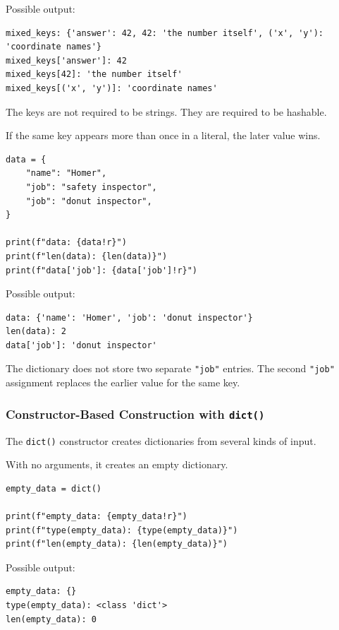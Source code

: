 Possible output:

\begin{verbatim}
mixed_keys: {'answer': 42, 42: 'the number itself', ('x', 'y'): 'coordinate names'}
mixed_keys['answer']: 42
mixed_keys[42]: 'the number itself'
mixed_keys[('x', 'y')]: 'coordinate names'
\end{verbatim}

The keys are not required to be strings. They are required to be hashable.

If the same key appears more than once in a literal, the later value wins.

\begin{verbatim}
data = {
    "name": "Homer",
    "job": "safety inspector",
    "job": "donut inspector",
}

print(f"data: {data!r}")
print(f"len(data): {len(data)}")
print(f"data['job']: {data['job']!r}")
\end{verbatim}

Possible output:

\begin{verbatim}
data: {'name': 'Homer', 'job': 'donut inspector'}
len(data): 2
data['job']: 'donut inspector'
\end{verbatim}

The dictionary does not store two separate \texttt{"job"} entries. The second \texttt{"job"} assignment replaces the earlier value for the same key.

\subsubsection{Constructor-Based Construction with \texttt{dict()}}

The \texttt{dict()} constructor creates dictionaries from several kinds of input.

With no arguments, it creates an empty dictionary.

\begin{verbatim}
empty_data = dict()

print(f"empty_data: {empty_data!r}")
print(f"type(empty_data): {type(empty_data)}")
print(f"len(empty_data): {len(empty_data)}")
\end{verbatim}

Possible output:

\begin{verbatim}
empty_data: {}
type(empty_data): <class 'dict'>
len(empty_data): 0
\end{verbatim}

